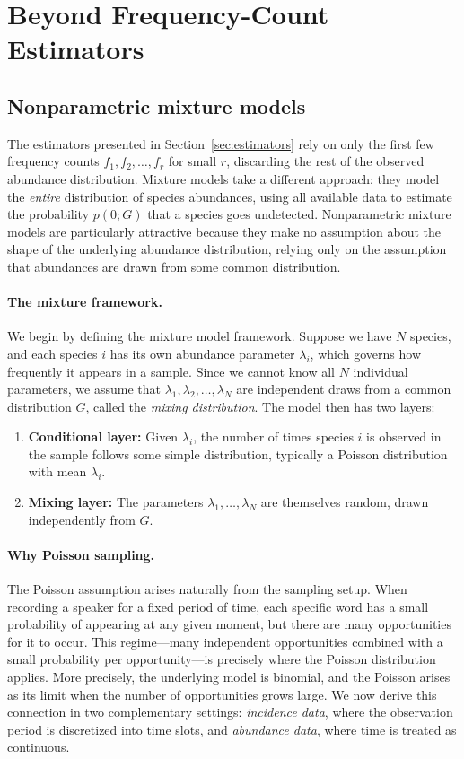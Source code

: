 \documentclass{article}
\begin{document}
{\section{Beyond Frequency-Count Estimators}\label{sec:shape}

\subsection{Nonparametric mixture models}\label{sec:mixture_models}

The estimators presented in Section~\ref{sec:estimators} rely on only the first few frequency counts $f_1, f_2, \ldots, f_r$ for small $r$, discarding the rest of the observed abundance distribution. Mixture models take a different approach: they model the \emph{entire} distribution of species abundances, using all available data to estimate the probability $p(0;G)$ that a species goes undetected. Nonparametric mixture models are particularly attractive because they make no assumption about the shape of the underlying abundance distribution, relying only on the assumption that abundances are drawn from some common distribution.

\paragraph{The mixture framework.}
We begin by defining the mixture model framework. Suppose we have $N$ species, and each species $i$ has its own abundance parameter $\lambda_i$, which governs how frequently it appears in a sample. Since we cannot know all $N$ individual parameters, we assume that $\lambda_1, \lambda_2, \ldots, \lambda_N$ are independent draws from a common distribution $G$, called the \emph{mixing distribution}. The model then has two layers:
\begin{enumerate}
    \item \textbf{Conditional layer:} Given $\lambda_i$, the number of times species $i$ is observed in the sample follows some simple distribution, typically a Poisson distribution with mean 
    $\lambda_i$.
    \item \textbf{Mixing layer:} The parameters $\lambda_1, \ldots, \lambda_N$ are themselves random, drawn independently from $G$.
\end{enumerate}

\paragraph{Why Poisson sampling.}
The Poisson assumption arises naturally from the sampling setup. When recording a speaker for a fixed period of time, each specific word has a small probability of appearing at any given moment, but there are many opportunities for it to occur. This regime---many independent opportunities combined with a small probability per opportunity---is precisely where the Poisson distribution applies. More precisely, the underlying model is binomial, and the Poisson arises as its limit when the number of opportunities grows large. We now derive this connection in two complementary settings: \emph{incidence data}, where the observation period is discretized into time slots, and \emph{abundance data}, where time is treated as continuous.
 
}
\end{document}
